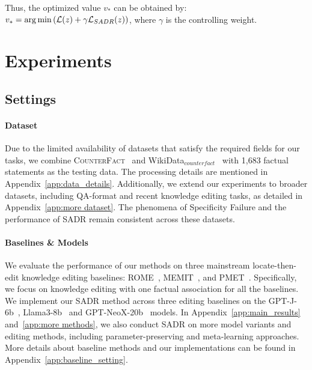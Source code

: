 Thus, the optimized value \( v_* \) can be obtained by: $v_* = \operatorname*{arg\,min} \left(\mathcal{L}(z) +  \gamma \mathcal{L}_{SADR}(z)\right)$, where $\gamma$ is the controlling weight.

\section{Experiments}
\label{sec:experiment}
\subsection{Settings}
\paragraph{Dataset}
Due to the limited availability of datasets that satisfy the required fields for our tasks, we combine \textsc{CounterFact}~\citep{rome} and WikiData$_{counterfact}$~\citep{zhang2024comprehensive} with 1,683 factual statements as the testing data. The processing details are mentioned in Appendix~\ref{app:data_details}.
Additionally, we extend our experiments to broader datasets, including QA-format and recent knowledge editing tasks, as detailed in Appendix~\ref{app:more dataset}. The phenomena of Specificity Failure and the performance of SADR remain consistent across these datasets.

\paragraph{Baselines \& Models}
We evaluate the performance of our methods on three mainstream locate-then-edit knowledge editing baselines: ROME~\citep{rome}, MEMIT~\citep{memit}, and PMET~\citep{pmet}. 
Specifically, we focus on knowledge editing with one factual association for all the baselines.
We implement our SADR method across three editing baselines on the GPT-J-6b~\citep{gpt-j}, Llama3-8b~\citep{llama3modelcard} and GPT-NeoX-20b~\citep{black-etal-2022-gpt} models. 
In Appendix~\ref{app:main_results} and~\ref{app:more methods}, we also conduct SADR on more model variants and editing methods, including parameter-preserving and meta-learning approaches.
More details about baseline methods and our implementations can be found in Appendix~\ref{app:baseline_setting}.

